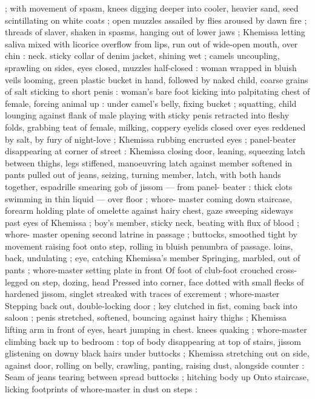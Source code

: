 ; with movement of spasm, knees digging deeper into cooler, heavier
sand, seed scintillating on white coats ; open muzzles assailed by
flies aroused by dawn fire ; threads of slaver, shaken in spasms,
hanging out of lower jaws ; Khemissa letting saliva mixed with licorice
overflow from lips, run out of wide-open mouth, over chin : neck.
sticky collar of denim jacket, shining wet ; camels uncoupling,
sprawling on sides, eyes closed, muzzles half-closed : woman
wrapped in bluish veils looming, green plastic bucket in hand,
followed by naked child, coarse grains of salt sticking to short penis
: woman's bare foot kicking into palpitating chest of female, forcing
animal up : under camel's belly, fixing bucket ; squatting, child
lounging against flank of male playing with sticky penis retracted
into fleshy folds, grabbing teat of female, milking, coppery eyelids
closed over eyes reddened by salt, by fury of night-love ; Khemissa
rubbing encrusted eyes ; panel-beater disappearing at corner of
street : Khemissa closing door, leaning, squeezing latch between
thighs, legs stiffened, manoeuvring latch against member softened in
pants pulled out of jeans, seizing, turning member, latch, with both
hands together, espadrille smearing gob of jissom --- from panel-
beater : thick clots swimming in thin liquid --- over floor ; whore-
master coming down staircase, forearm holding plate of omelette
against hairy chest, gaze sweeping sideways past eyes of Khemissa
; boy’s member, sticky neck, beating with flux of blood ; whore-
master opening second latrine in passage ; buttocks, smoothed tight
by movement raising foot onto step, rolling in bluish penumbra of
passage. loins, back, undulating ; eye, catching Khemissa’s member
Springing, marbled, out of pants ; whore-master setting plate in front
Of foot of club-foot crouched cross-legged on step, dozing, head
Pressed into corner, face dotted with small flecks of hardened
jissom, singlet streaked with traces of excrement ; whore-master
Stepping back out, double-locking door ; key clutched in fist, coming
back into saloon ; penis stretched, softened, bouncing against hairy
thighs ; Khemissa lifting arm in front of eyes, heart jumping in chest.
knees quaking ; whore-master climbing back up to bedroom : top of
body disappearing at top of stairs, jissom glistening on downy black
hairs under buttocks ; Khemissa stretching out on side, against door,
rolling on belly, crawling, panting, raising dust, alongside counter :
Seam of jeans tearing between spread buttocks ; hitching body up
Onto staircase, licking footprints of whore-master in dust on steps :
